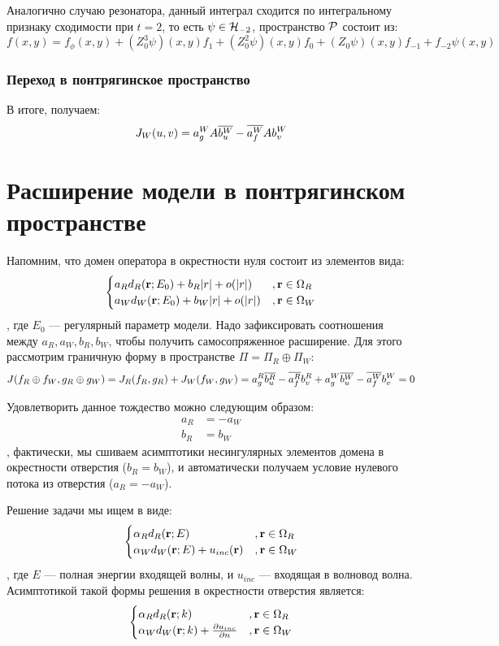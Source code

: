 Аналогично случаю резонатора, данный интеграл сходится по интегральному признаку сходимости при $t = 2$, то есть $\psi \in \mathcal{H}_{-2}$, пространство $\mathcal{P}$ состоит из:
\[
f(x, y) = f_\phi(x, y) + (Z_0^3 \psi)(x, y) f_1 + (Z_0^2 \psi)(x, y) f_0 + (Z_0 \psi)(x, y) f_{-1} + f_{-2} \psi(x, y)
\]


\subsubsection{Переход в понтрягинское пространство}
В итоге, получаем:
\begin{align*}
J_W(u, v) = a^W_g A \overline{b^W_u} - \overline{a^W_f} A b^W_v 
\end{align*}

\section{Расширение модели в понтрягинском пространстве}
Напомним, что домен оператора в окрестности нуля состоит из элементов вида:
\[
\begin{cases}
a_R d_R(\vb{r}; E_0) + b_R |r| + o(|r|)  &, \vb{r} \in \Omega_R \\
a_W d_W(\vb{r}; E_0) + b_W |r| + o(|r|)  &, \vb{r} \in \Omega_W \\
\end{cases}
\], где $E_0$ — регулярный параметр модели. Надо зафиксировать соотношения между $a_R, a_W, b_R, b_W$, чтобы получить самосопряженное расширение. Для этого рассмотрим граничную форму в пространстве $\Pi = \Pi_R \oplus \Pi_W$:
\[
J(f_R \oplus f_W, g_R \oplus g_W) = J_R(f_R, g_R) + J_W(f_W, g_W) = a^R_g \overline{b^R_u} - \overline{a^R_f} b^R_v  + a^W_g \overline{b^W_u} - \overline{a^W_f} b^W_v  = 0
\]

Удовлетворить данное тождество можно следующим образом:
\begin{align*}
a_R &= -a_W \\
b_R &= b_W
\end{align*}
, фактически, мы сшиваем асимптотики несингулярных элементов домена в окрестности отверстия ($b_R = b_W$), и автоматически получаем условие нулевого потока из отверстия ($a_R = -a_W$).

Решение задачи мы ищем в виде:
\[
\begin{cases}
\alpha_R d_R(\vb{r}; E) &, \vb{r} \in \Omega_R \\
\alpha_W d_W(\vb{r}; E) + u_{inc}(\vb{r})&, \vb{r} \in \Omega_W
\end{cases}
\], где $E$ — полная энергии входящей волны, и $u_{inc}$ — входящая в волновод волна. Асимптотикой такой формы решения в окрестности отверстия является:
\[
\begin{cases}
\alpha_R d_R(\vb{r}; k) &, \vb{r} \in \Omega_R \\
\alpha_W d_W(\vb{r}; k) + \pdv{u_{inc}}{n} (\vb{r}) &, \vb{r} \in \Omega_W
\end{cases}
\]

